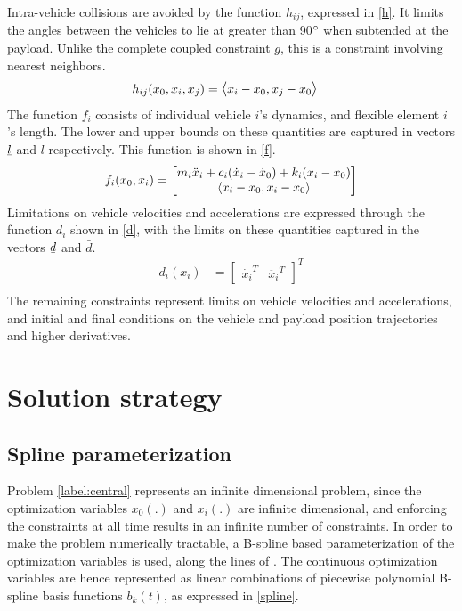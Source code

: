 \documentclass[letterpaper, 10 pt, conference]{ieeeconf}
\newcommand{\ubar}[1]{\text{\b{$#1$}}}
\begin{document}
\noindent
Intra-vehicle collisions are avoided by the function $h_{ij}$, expressed in \eqref{h}. It limits the angles between the vehicles to lie at greater than 90$\degree$ when subtended at the payload. Unlike the complete coupled constraint $g$, this is a constraint involving nearest neighbors.
 \begin{equation}\label{h}
\begin{aligned}
h_{ij}(x_0,x_i,x_j) &= \mathlarger{\langle} x_i - x_0,x_j - x_0 \mathlarger{\rangle}
\end{aligned}
\end{equation}
The function $f_i$ consists of individual vehicle $i$'s dynamics, and flexible element $i$'s length. The lower and upper bounds on these quantities are captured in vectors $\ubar{l}$ and $\bar{l}$ respectively. This function is shown in \eqref{f}. 
 \begin{equation}\label{f}
 \begin{aligned}
 f_i(x_0,x_i) &=
 \begin{bmatrix}
   m_i\ddot{x}_i + c_i(\dot{x}_i-\dot{x}_0) + k_i(x_i-x_0) \\
  \mathlarger{\langle} x_i - x_0,x_i - x_0 \mathlarger{\rangle}
 \end{bmatrix} \\
 \end{aligned}
 \end{equation}
 Limitations on vehicle velocities and accelerations are expressed through the function $d_i$ shown in \eqref{d}, with the limits on these quantities captured in the vectors $\ubar{d}$ and $\bar{d}$.
 \begin{equation}\label{d}
 \begin{aligned}
 d_i(x_i) &=
 \begin{bmatrix}
  \dot{x_i}^T & \ddot{x_i}^T
 \end{bmatrix}^T \\
 \end{aligned}
 \end{equation}
 The remaining constraints represent limits on vehicle velocities and accelerations, and initial and final conditions on the vehicle and payload position trajectories and higher derivatives.
\section{Solution strategy}
\subsection{Spline parameterization}
Problem \eqref{label:central} represents an infinite dimensional problem, since the optimization variables $x_0(.)$ and $x_i(.)$ are infinite dimensional, and enforcing the constraints at all time results in an infinite number of constraints. In order to make the problem numerically tractable, a B-spline based parameterization of the optimization variables is used, along the lines of \cite{c15}. The continuous optimization variables are hence represented as linear combinations of piecewise polynomial B-spline basis functions $b_k(t)$, as expressed in \eqref{spline}.
\end{document}
